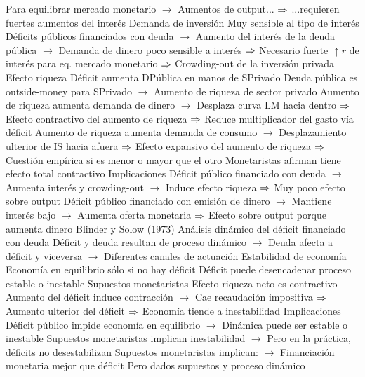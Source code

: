 \documentclass{nuevotema}
\begin{document}
\begin{esquemal}
				\4[] Para equilibrar mercado monetario
				\4[] $\to$ Aumentos de output...
				\4[] $\Rightarrow$ ...requieren fuertes aumentos del interés
				\4 Demanda de inversión
				\4[] Muy sensible al tipo de interés
				\4[] Déficits públicos financiados con deuda
				\4[] $\to$ Aumento del interés de la deuda pública
				\4[] $\to$ Demanda de dinero poco sensible a interés
				\4[] $\Rightarrow$ Necesario fuerte $\uparrow r$ de interés para eq. mercado monetario
				\4[] $\Rightarrow$ Crowding-out de la inversión privada
				\4 Efecto riqueza
				\4[] Déficit aumenta DPública en manos de SPrivado
				\4[] Deuda pública es outside-money para SPrivado
				\4[] $\to$ Aumento de riqueza de sector privado
				\4[] Aumento de riqueza aumenta demanda de dinero
				\4[] $\to$ Desplaza curva LM hacia dentro
				\4[] $\Rightarrow$ Efecto contractivo del aumento de riqueza
				\4[] $\Rightarrow$ Reduce multiplicador del gasto vía déficit
				\4[] Aumento de riqueza aumenta demanda de consumo
				\4[] $\to$ Desplazamiento ulterior de IS hacia afuera
				\4[] $\Rightarrow$ Efecto expansivo del aumento de riqueza
				\4[] $\Rightarrow$ Cuestión empírica si es menor o mayor que el otro
				\4[] Monetaristas afirman tiene efecto total contractivo
				\4 Implicaciones
				\4[] Déficit público financiado con deuda
				\4[] $\to$ Aumenta interés y crowding-out
				\4[] $\to$ Induce efecto riqueza
				\4[] $\Rightarrow$ Muy poco efecto sobre output
				\4[] Déficit público financiado con emisión de dinero
				\4[] $\to$ Mantiene interés bajo
				\4[] $\to$ Aumenta oferta monetaria
				\4[] $\Rightarrow$ Efecto sobre output porque aumenta dinero
			\3 Blinder y Solow (1973)
				\4 Análisis dinámico del déficit financiado con deuda
				\4[] Déficit y deuda resultan de proceso dinámico
				\4[] $\to$ Deuda afecta a déficit y viceversa
				\4[] $\to$ Diferentes canales de actuación
				\4 Estabilidad de economía
				\4[] Economía en equilibrio sólo si no hay déficit
				\4[] Déficit puede desencadenar proceso estable o inestable
				\4 Supuestos monetaristas
				\4[] Efecto riqueza neto es contractivo
				\4[] Aumento del déficit induce contracción
				\4[] $\to$ Cae recaudación impositiva
				\4[] $\Rightarrow$ Aumento ulterior del déficit
				\4[] $\Rightarrow$ Economía tiende a inestabilidad
				\4 Implicaciones
				\4[] Déficit público impide economía en equilibrio
				\4[] $\to$ Dinámica puede ser estable o inestable
				\4[] Supuestos monetaristas implican inestabilidad
				\4[] $\to$ Pero en la práctica, déficits no desestabilizan
				\4[] Supuestos monetaristas implican:
				\4[] $\to$ Financiación monetaria mejor que déficit
				\4[] Pero dados supuestos y proceso dinámico

\end{esquemal}
\end{document}
